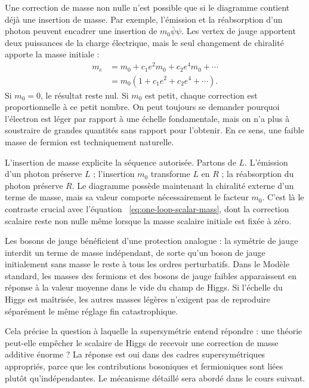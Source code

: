 Une correction de masse non nulle n’est possible que si le diagramme contient déjà une insertion de masse. Par exemple, l’émission et la réabsorption d’un photon peuvent encadrer une insertion de \(m_0\bar\psi\psi\). Les vertex de jauge apportent deux puissances de la charge électrique, mais le seul changement de chiralité apporte la masse initiale :
\begin{equation}
\begin{aligned}
m_e
&=m_0+c_1e^2m_0+c_2e^4m_0+\cdots\\
&=m_0\left(1+c_1e^2+c_2e^4+\cdots\right).
\end{aligned}
\label{eq:multiplicative-fermion-mass}
\end{equation}
Si \(m_0=0\), le résultat reste nul. Si \(m_0\) est petit, chaque correction est proportionnelle à ce petit nombre. On peut toujours se demander pourquoi l’électron est léger par rapport à une échelle fondamentale, mais on n’a plus à soustraire de grandes quantités sans rapport pour l’obtenir. En ce sens, une faible masse de fermion est techniquement naturelle.

L’insertion de masse explicite la séquence autorisée. Partons de \(L\). L’émission d’un photon préserve \(L\) ; l’insertion \(m_0\) transforme \(L\) en \(R\) ; la réabsorption du photon préserve \(R\). Le diagramme possède maintenant la chiralité externe d’un terme de masse, mais sa valeur comporte nécessairement le facteur \(m_0\). C’est là le contraste crucial avec l’équation ~\eqref{eq:one-loop-scalar-mass}, dont la correction scalaire reste non nulle même lorsque la masse scalaire initiale est fixée à zéro.

Les bosons de jauge bénéficient d’une protection analogue : la symétrie de jauge interdit un terme de masse indépendant, de sorte qu’un boson de jauge initialement sans masse le reste à tous les ordres perturbatifs. Dans le Modèle standard, les masses des fermions et des bosons de jauge faibles apparaissent en réponse à la valeur moyenne dans le vide du champ de Higgs. Si l’échelle du Higgs est maîtrisée, les autres masses légères n’exigent pas de reproduire séparément le même réglage fin catastrophique.

Cela précise la question à laquelle la supersymétrie entend répondre : une théorie peut-elle empêcher le scalaire de Higgs de recevoir une correction de masse additive énorme ? La réponse est oui dans des cadres supersymétriques appropriés, parce que les contributions bosoniques et fermioniques sont liées plutôt qu’indépendantes. Le mécanisme détaillé sera abordé dans le cours suivant.


